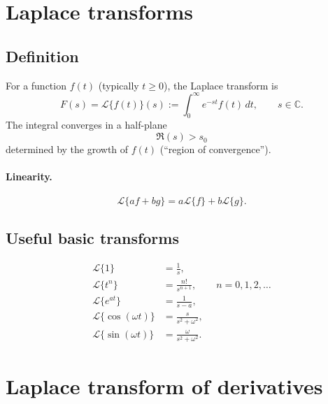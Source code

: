 
\section{Laplace transforms}

\subsection{Definition}
For a function $f(t)$ (typically $t\ge 0$), the Laplace transform is
\begin{equation}
F(s) = \mathcal{L}\{f(t)\}(s) := \int_{0}^{\infty} e^{-st} f(t)\,dt,
\qquad s\in\mathbb{C}.
\end{equation}
The integral converges in a half-plane
\[
\Re(s) > s_0
\]
determined by the growth of $f(t)$ (``region of convergence'').

\paragraph{Linearity.}
\begin{equation}
\mathcal{L}\{af+bg\}=a\mathcal{L}\{f\}+b\mathcal{L}\{g\}.
\end{equation}

\subsection{Useful basic transforms}
\begin{align}
\mathcal{L}\{1\} &= \frac{1}{s},\\
\mathcal{L}\{t^n\} &= \frac{n!}{s^{n+1}}, \qquad n=0,1,2,\dots\\
\mathcal{L}\{e^{at}\} &= \frac{1}{s-a},\\
\mathcal{L}\{\cos(\omega t)\} &= \frac{s}{s^2+\omega^2},\\
\mathcal{L}\{\sin(\omega t)\} &= \frac{\omega}{s^2+\omega^2}.
\end{align}


\section{Laplace transform of derivatives}

